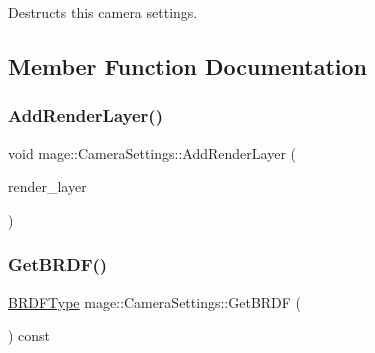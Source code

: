 Destructs this camera settings. 

\subsection{Member Function Documentation}
\hypertarget{classmage_1_1_camera_settings_ab1dca8b8f52daf55614592e0bb640ae9}{}\label{classmage_1_1_camera_settings_ab1dca8b8f52daf55614592e0bb640ae9} 
\subsubsection{\texorpdfstring{Add\+Render\+Layer()}{AddRenderLayer()}}
{\footnotesize\ttfamily void mage\+::\+Camera\+Settings\+::\+Add\+Render\+Layer (\begin{DoxyParamCaption}\item[{\hyperlink{namespacemage_a8b4a82582105b0299e2c2be5af7255d6}{Render\+Layer}}]{render\+\_\+layer }\end{DoxyParamCaption})\hspace{0.3cm}{\ttfamily [noexcept]}}

\hypertarget{classmage_1_1_camera_settings_a31504f7e9b23404ee1b200561b8dd789}{}\label{classmage_1_1_camera_settings_a31504f7e9b23404ee1b200561b8dd789} 
\subsubsection{\texorpdfstring{Get\+B\+R\+D\+F()}{GetBRDF()}}
{\footnotesize\ttfamily \hyperlink{namespacemage_ae7a7a03a7b34d7e2689689bb8295cd38}{B\+R\+D\+F\+Type} mage\+::\+Camera\+Settings\+::\+Get\+B\+R\+DF (\begin{DoxyParamCaption}{ }\end{DoxyParamCaption}) const\hspace{0.3cm}{\ttfamily [noexcept]}}

\hypertarget{classmage_1_1_camera_settings_a6673291bcfed8fa2c0a0041bf8f97f24}{}\label{classmage_1_1_camera_settings_a6673291bcfed8fa2c0a0041bf8f97f24} 
